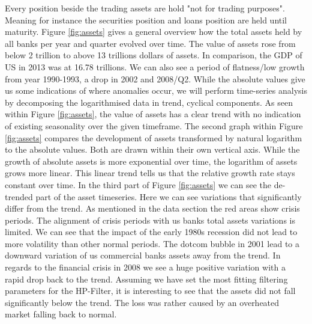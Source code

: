 \documentclass[12pt, a4paper]{article} %
\begin{document}
 Every position beside the trading assets are hold "not for trading purposes". Meaning for instance the securities position and loans position are held until maturity. 
 Figure \ref{fig:assets} gives a general overview how the total assets held by all banks per year and quarter evolved over time. The value of assets rose from below 2 trillion to above 13 trillions dollars of assets. In comparison, the GDP of US in 2013 was at 16.78 trillions. We can also see a period of flatness/low growth from  year 1990-1993, a drop in 2002 and 2008/Q2. While the absolute values give us some indications of where anomalies occur, we will perform time-series analysis by decomposing the logarithmised data in trend, cyclical components. As seen within Figure \ref{fig:assets}, the value of assets has a clear trend with no indication of existing seasonality over the given timeframe. The second graph within Figure \ref{fig:assets} compares the development of assets transformed by natural logarithm to the absolute values. Both are drawn within their own vertical axis. While the growth of absolute assets is more exponential over time, the logarithm of assets grows more linear. This linear trend tells us that the relative growth rate stays constant over time. In the third part of Figure \ref{fig:assets} we can see the de-trended part of the asset timeseries. Here we can see variations that significantly differ from the trend. As mentioned in the data section the red areas show crisis periods. The alignment of crisis periods with us banks total assets variations is limited. We can see that the impact of the early 1980s recession did not lead to more volatility than other normal periods. The dotcom bubble in 2001 lead to a downward variation of us commercial banks assets away from the trend. In regards to the financial crisis in 2008 we see a huge positive variation with a rapid drop back to the trend. Assuming we have set the most fitting filtering parameters for the HP-Filter, it is interesting to see that the assets did not fall significantly below the trend. The loss was rather caused by an overheated market falling back to normal.
 
\end{document}
